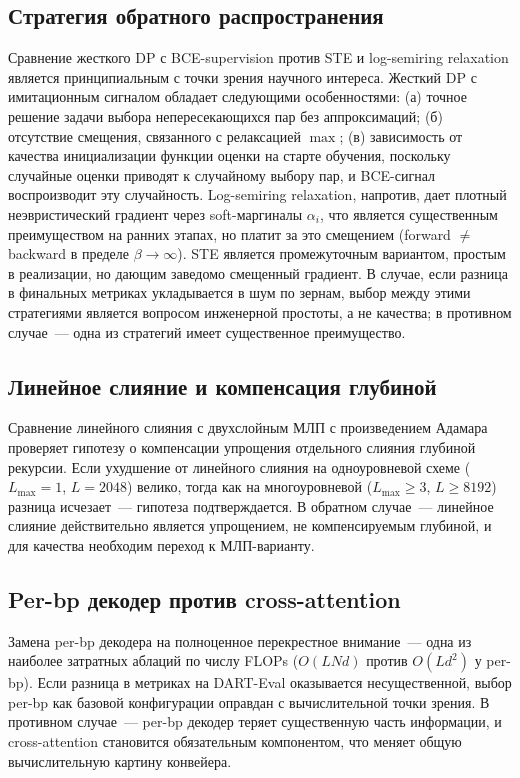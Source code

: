 \subsection{Стратегия обратного распространения}

Сравнение жесткого DP с BCE-supervision против STE и log-semiring
relaxation является принципиальным с точки зрения научного интереса.
Жесткий DP с имитационным сигналом обладает следующими
особенностями: (а) точное решение задачи выбора непересекающихся пар
без аппроксимаций; (б) отсутствие смещения, связанного с релаксацией
$\max$; (в) зависимость от качества инициализации функции оценки на
старте обучения, поскольку случайные оценки приводят к случайному
выбору пар, и BCE-сигнал воспроизводит эту случайность. Log-semiring
relaxation, напротив, дает плотный неэвристический градиент через
soft-маргиналы $\alpha_i$, что является существенным преимуществом на
ранних этапах, но платит за это смещением (forward $\neq$ backward в
пределе $\beta \to \infty$). STE является промежуточным вариантом,
простым в реализации, но дающим заведомо смещенный градиент. В случае,
если разница в финальных метриках укладывается в шум по зернам, выбор
между этими стратегиями является вопросом инженерной простоты, а не
качества; в противном случае~--- одна из стратегий имеет существенное
преимущество.

\subsection{Линейное слияние и компенсация глубиной}

Сравнение линейного слияния с двухслойным МЛП с произведением Адамара
проверяет гипотезу о компенсации упрощения отдельного слияния глубиной
рекурсии. Если ухудшение от линейного слияния на одноуровневой схеме
($L_{\max} = 1$, $L = 2048$) велико, тогда как на многоуровневой
($L_{\max} \geq 3$, $L \geq 8192$) разница исчезает~--- гипотеза
подтверждается. В обратном случае~--- линейное слияние действительно
является упрощением, не компенсируемым глубиной, и для качества
необходим переход к МЛП-варианту.

\subsection{Per-bp декодер против cross-attention}

Замена per-bp декодера на полноценное перекрестное внимание~--- одна
из наиболее затратных аблаций по числу FLOPs ($O(LNd)$ против $O(Ld^2)$
у per-bp). Если разница в метриках на DART-Eval оказывается
несущественной, выбор per-bp как базовой конфигурации оправдан с
вычислительной точки зрения. В противном случае~--- per-bp декодер
теряет существенную часть информации, и cross-attention становится
обязательным компонентом, что меняет общую вычислительную картину
конвейера.

